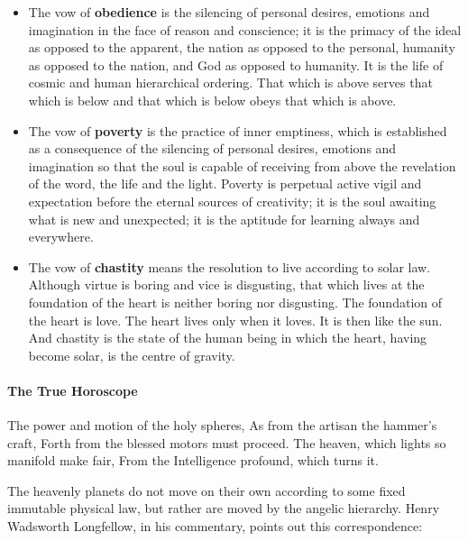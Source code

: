 \begin{itemize}
\item The vow of \textbf{obedience} is the silencing of personal desires, emotions and imagination in the face of reason
and conscience; it is the primacy of the ideal as opposed to the apparent, the nation as opposed to the personal,
humanity as opposed to the nation, and God as opposed to humanity. It is the life of cosmic and human hierarchical
ordering. That which is above serves that which is below and that which is below obeys that which is above. 
\item The vow of \textbf{poverty} is the practice of inner emptiness, which is established as a consequence of the
silencing of personal desires, emotions and imagination so that the soul is capable of receiving from above the
revelation of the word, the life and the light. Poverty is perpetual active vigil and expectation before the eternal
sources of creativity; it is the soul awaiting what is new and unexpected; it is the aptitude for learning always and
everywhere. 
\item The vow of \textbf{chastity} means the resolution to live according to solar law. Although virtue is boring and
vice is disgusting, that which lives at the foundation of the heart is neither boring nor disgusting. The foundation of
the heart is love. The heart lives only when it loves. It is then like the sun. And chastity is the state of the human
being in which the heart, having become solar, is the centre of gravity. 
\end{itemize}

\paragraph{The True Horoscope}
\begin{quotex}
The power and motion of the holy spheres,\newline
As from the artisan the hammer's craft,\newline
Forth from the blessed motors must proceed.\newline
The heaven, which lights so manifold make fair,\newline
From the Intelligence profound, which turns it. 

\end{quotex}
The heavenly planets do not move on their own according to some fixed immutable physical law, but rather are moved by
the angelic hierarchy. Henry Wadsworth Longfellow, in his commentary, points out this correspondence:

